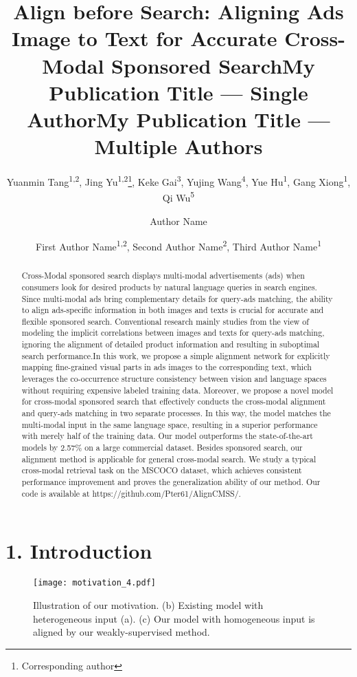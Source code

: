 \documentclass[letterpaper]{article} \usepackage{aaai24}  \usepackage{times}  \usepackage{helvet}  \usepackage{courier}  \usepackage[hyphens]{url}  \usepackage{graphicx} \urlstyle{rm} \def\UrlFont{\rm}  \usepackage{natbib}  \usepackage{caption} \frenchspacing  \setlength{\pdfpagewidth}{8.5in}  \setlength{\pdfpageheight}{11in}
\title{Align before Search: Aligning Ads Image to Text for Accurate Cross-Modal Sponsored Search}
\author {
Yuanmin Tang\textsuperscript{\rm 1,\rm 2},
    Jing Yu\textsuperscript{\rm 1,\rm 2}\thanks{Corresponding author},
    Keke Gai\textsuperscript{\rm 3}, 
    Yujing Wang\textsuperscript{\rm 4},
    Yue Hu\textsuperscript{\rm 1}, 
    Gang Xiong\textsuperscript{\rm 1},
    Qi Wu\textsuperscript{\rm 5}
}
\title{My Publication Title --- Single Author}
\author {
    Author Name
}
\title{My Publication Title --- Multiple Authors}
\author {
First Author Name\textsuperscript{\rm 1,\rm 2},
    Second Author Name\textsuperscript{\rm 2},
    Third Author Name\textsuperscript{\rm 1}
}
\begin{document}
\maketitle

\begin{abstract}
Cross-Modal sponsored search displays multi-modal advertisements (ads) when consumers look for desired products by natural language queries in search engines. Since multi-modal ads bring complementary details for query-ads matching, the ability to align ads-specific information in both images and texts is crucial for accurate and flexible sponsored search. Conventional research mainly studies from the view of modeling the implicit correlations between images and texts for query-ads matching, ignoring the alignment of detailed product information and resulting in suboptimal search performance.In this work,  we propose a simple alignment network for explicitly mapping fine-grained visual parts in ads images to the corresponding text, which leverages the co-occurrence structure consistency between vision and language spaces without requiring expensive labeled training data. Moreover, we propose a novel model for cross-modal sponsored search that effectively conducts the cross-modal alignment and query-ads matching in two separate processes. In this way, the model matches the multi-modal input in the same language space, resulting in a superior performance with merely half of the training data. Our model outperforms the state-of-the-art models by 2.57\%  on a large commercial dataset. Besides sponsored search, our alignment method is applicable for general cross-modal search. We study a typical cross-modal retrieval task on the MSCOCO dataset, which achieves consistent performance improvement and proves the generalization ability of our method. Our code is available at https://github.com/Pter61/AlignCMSS/.
\end{abstract} 

\section{1. Introduction}
\label{sec:intro}

\begin{figure}[t]
\setlength{\belowcaptionskip}{-5pt}
    \centering
    \texttt{[image: motivation\_4.pdf]}
    \caption{Illustration of our motivation. (b) Existing model with heterogeneous input (a). (c) Our model with homogeneous input is aligned by our weakly-supervised method.} 
    \label{fig:motivation}
\end{figure}
\end{document}

